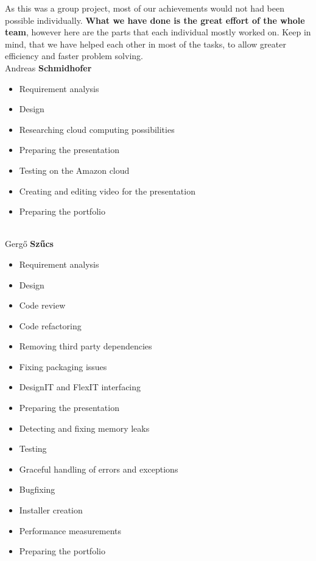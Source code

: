 \documentclass[a4paper, 11pt, article]{report}
\begin{document}
As this was a group project, most of our achievements would not had been possible individually. \textbf{What we have done is the great effort of the whole team}, however here are the parts that each individual mostly worked on. Keep in mind, that we have helped each other in most of the tasks, to allow greater efficiency and faster problem solving. \\

\noindent Andreas \textbf{Schmidhofer} 
\begin{itemize}
	\item Requirement analysis
	\item Design
	\item Researching cloud computing possibilities
	\item Preparing the presentation
	\item Testing on the Amazon cloud
	\item Creating and editing video for the presentation
	\item Preparing the portfolio
\end{itemize} 

\noindent \\ Gergő \textbf{Szűcs}
\begin{itemize}
	\item Requirement analysis
	\item Design
	\item Code review
	\item Code refactoring
	\item Removing third party dependencies
	\item Fixing packaging issues
	\item DesignIT and FlexIT interfacing
	\item Preparing the presentation
	\item Detecting and fixing memory leaks
	\item Testing 
	\item Graceful handling of errors and exceptions
	\item Bugfixing
	\item Installer creation
	\item Performance measurements
	\item Preparing the portfolio
\end{itemize}
\end{document}
